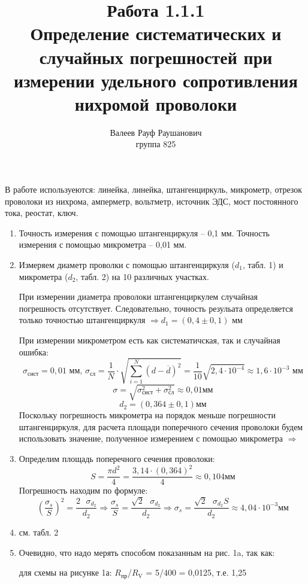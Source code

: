 \documentclass[a4paper, 10pt]{article}%
\author{Валеев Рауф Раушанович \\
группа 825}
\title{Работа 1.1.1 \\
Определение систематических и случайных погрешностей при измерении удельного сопротивления нихромой проволоки}
\begin{document}
\maketitle 
\newpage
В работе используеются: линейка, линейка, штангенциркуль, микрометр, отрезок проволоки из нихрома, амперметр, вольтметр, источник ЭДС, мост постоянного тока, реостат, ключ. 
\begin{enumerate}
\item Точность измерения с помощью штангенциркуля -- 0,1 мм. Точность измерения с помощью микрометра -- 0,01 мм.
\item Измеряем диаметр проволки с помощью штангенциркуля ($d_1$, табл. 1) и микрометра ($d_2$, табл. 2) на 10 различных участках.

При измерении диаметра проволоки штангенциркулем случайная погрешность отсутствует. Следовательно, точность резульата определяется только точностью штангенциркуля $\Rightarrow  d_1 = (0,4 \pm 0,1)$ мм 

При измерении микрометром есть как систематичская, так и случайная ошибка:
\[ \sigma_{\text{сист}}  = 0,01 \text{ мм, }
\sigma_{\text{сл}}  = \dfrac{1}{N} \cdot \sqrt{\sum_{i = 1}^N (d - \overline{d})^2} = \frac{1}{10}\sqrt{2,4\cdot10^{-4}} \approx 1,6\cdot10^{-3} \text{ мм}\]
\[ \sigma =  \sqrt{\sigma_{\text{сист}}^2 + \sigma_{\text{сл}}^2} \approx 0,01 \text{мм}\]
\[ d_2 = (0,364 \pm 0,1) \text{мм}\]
Поскольку погрешность микрометра на порядок меньше погрешности штангенциркуля, для расчета площади поперечного сечения проволоки будем использовать значение, полученное измерением с помощью микрометра $ \Rightarrow $
\item Определим площадь поперечного сечения проволоки: 
\[ S = \dfrac{ \pi d^2 }{4} = \dfrac{3,14 \cdot (0,364)^2}{4} \approx 0,104 \text{мм}\]
Погрешность находим по формуле:
\[ \left( \dfrac{\sigma_{s}}{S} \right)^2 =\dfrac{2 \text{ }\sigma_{d_2}}{d_2} \Rightarrow \dfrac{\sigma_{s}}{S} = \dfrac{\sqrt{2} \text{ } \sigma_{d_2}}{d_2} \Rightarrow \sigma_{s} =\dfrac{\sqrt{2} \text{ } \sigma_{d_2} S}{d_2} \approx 4,04 \cdot 10^{-3} \text{мм}\]
\item см. табл. 2
\item Очевидно, что надо мерять способом показанным на рис. 1a, так как:

для схемы на рисунке 1а: $R_{\text{пр}}$/$R_{\text{V}}$ = 5/400 = 0,0125, т.е. 1,25%


\end{enumerate}
\end{document}
